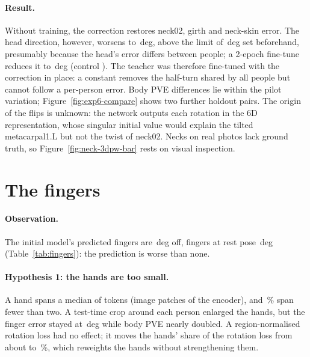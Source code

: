 \paragraph{Result.} Without training, the correction restores neck02, girth and neck-skin error. The head direction,
however, worsens to \DiagHeadDirNoTrain\,deg, above the limit of \DiagHeadDirLimit\,deg set beforehand, presumably
because the head's error differs between people; a 2-epoch fine-tune reduces it to \DiagHeadDirFineTune\,deg (control
\DiagHeadDirCtrlTwo). The teacher was therefore fine-tuned with the correction in place: a constant removes the half-turn
shared by all people but cannot follow a per-person error. Body PVE differences lie
within the pilot variation; Figure~\ref{fig:exp6-compare} shows two further holdout pairs. The origin of the flips is unknown: the network outputs each rotation in the 6D representation, whose singular
initial value would explain the tilted metacarpal1.L but not the twist of neck02. Necks on real photos lack ground
truth, so Figure~\ref{fig:neck-3dpw-bar} rests on visual inspection.

\section{The fingers}
\label{sec:diag-fingers}



\paragraph{Observation.} The initial model's predicted fingers are \DiagFingersBase\,deg off, fingers at rest pose
\DiagFingersRest\,deg (Table~\ref{tab:fingers}): the prediction is worse than none.

\paragraph{Hypothesis 1: the hands are too small.} A hand spans a median of \DiagHandTokens{} tokens (image patches
of the encoder), and \DiagHandUnderTwo\,\% span fewer than two. A test-time crop around each person enlarged the
hands, but the finger error stayed at \DiagFingersZoom\,deg while body PVE nearly doubled. A region-normalised
rotation loss had no effect; it moves the hands' share of the
rotation loss from about \DiagHandShareBoost{} to \DiagHandShareRegion\,\%, which reweights the hands without
strengthening them.

